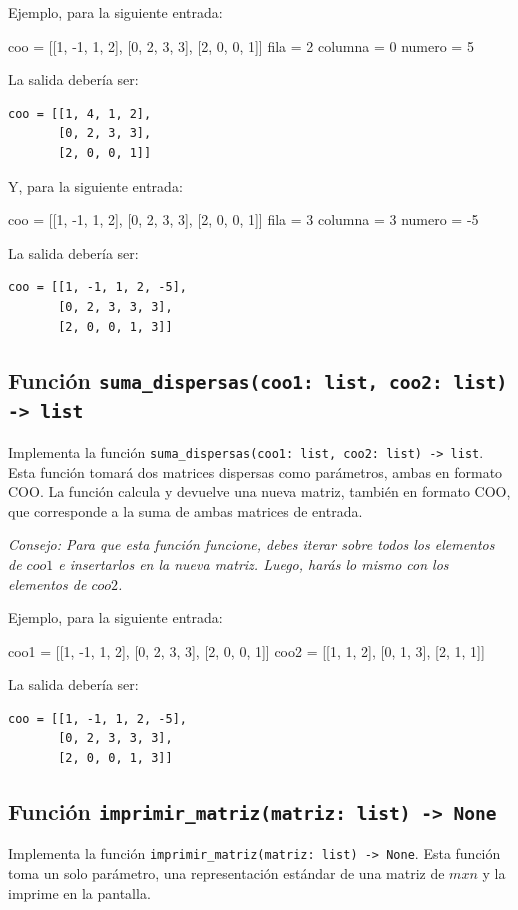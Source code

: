 \documentclass[10pt,a4paper]{article}
\begin{document}
Ejemplo, para la siguiente entrada:
\begin{attachedlisting}[sparse6]
coo = [[1, -1, 1, 2],
       [0, 2, 3, 3],
       [2, 0, 0, 1]]
fila = 2
columna = 0
numero = 5
\end{attachedlisting}

La salida debería ser:
\begin{lstlisting}
coo = [[1, 4, 1, 2],
       [0, 2, 3, 3],
       [2, 0, 0, 1]]
\end{lstlisting}

Y, para la siguiente entrada:
\begin{attachedlisting}[sparse7]
coo = [[1, -1, 1, 2],
       [0, 2, 3, 3],
       [2, 0, 0, 1]]
fila = 3
columna = 3
numero = -5
\end{attachedlisting}

La salida debería ser:
\begin{lstlisting}
coo = [[1, -1, 1, 2, -5],
       [0, 2, 3, 3, 3],
       [2, 0, 0, 1, 3]]
\end{lstlisting}

\subsection*{Función \lstinline|suma_dispersas(coo1: list, coo2: list) -> list|}
Implementa la función \lstinline|suma_dispersas(coo1: list, coo2: list) -> list|. Esta función tomará dos matrices dispersas como parámetros, ambas en formato COO. La función calcula y devuelve una nueva matriz, también en formato COO, que corresponde a la suma de ambas matrices de entrada.

\emph{Consejo: Para que esta función funcione, debes iterar sobre todos los elementos de $coo1$ e insertarlos en la nueva matriz. Luego, harás lo mismo con los elementos de $coo2$.}

Ejemplo, para la siguiente entrada:
\begin{attachedlisting}[sparse8]
coo1 = [[1, -1, 1, 2],
        [0, 2, 3, 3],
        [2, 0, 0, 1]]
coo2 = [[1, 1, 2],
        [0, 1, 3],
        [2, 1, 1]]
\end{attachedlisting}

La salida debería ser:
\begin{lstlisting}
coo = [[1, -1, 1, 2, -5],
       [0, 2, 3, 3, 3],
       [2, 0, 0, 1, 3]]
\end{lstlisting}

\subsection*{Función \lstinline|imprimir_matriz(matriz: list) -> None|}
Implementa la función \lstinline|imprimir_matriz(matriz: list) -> None|. Esta función toma un solo parámetro, una representación estándar de una matriz de $m x n$ y la imprime en la pantalla.
\end{document}
